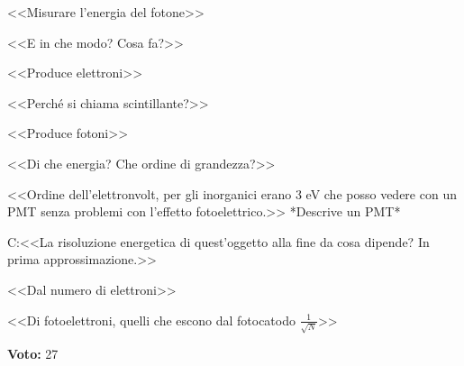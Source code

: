 \documentclass[../main.tex]{subfiles}
\begin{document}
\begin{enumerate}
{\begin{flushright}
        <<Misurare l'energia del fotone>>
        \end{flushright}
        <<E in che modo? Cosa fa?>>
        \begin{flushright}
        <<Produce elettroni>>
        \end{flushright}
        <<Perché si chiama scintillante?>>
        \begin{flushright}
        <<Produce fotoni>>
        \end{flushright}
        <<Di che energia? Che ordine di grandezza?>>
        \begin{flushright}
        <<Ordine dell'elettronvolt, per gli inorganici erano 3 eV che posso vedere con un PMT senza problemi con l'effetto fotoelettrico.>> *Descrive un PMT*
        \end{flushright}
        C:<<La risoluzione energetica di quest'oggetto alla fine da cosa dipende? In prima approssimazione.>>
        \begin{flushright}
        <<Dal numero di elettroni>>
        \end{flushright}
        <<Di fotoelettroni, quelli che escono dal fotocatodo $\frac{1}{\sqrt{N}}$>>
        }
    \end{enumerate}
    \textbf{Voto:} 27
\end{document}

